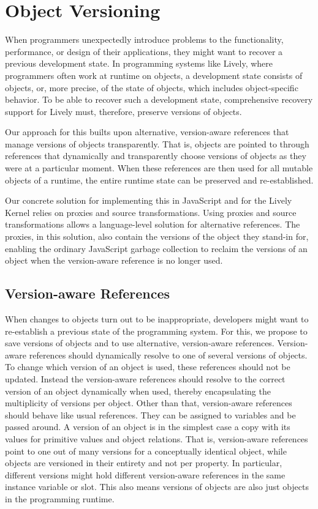 \chapter{Object Versioning} \label{chapter:APPROACH}

When programmers unexpectedly introduce problems to the functionality, performance, or design of their applications, they might want to recover a previous development state.
In programming systems like Lively, where programmers often work at runtime on objects, a development state consists of objects, or, more precise, of the state of objects, which includes object-specific behavior.
To be able to recover such a development state, comprehensive recovery support for Lively must, therefore, preserve versions of objects.

Our approach for this builts upon alternative, version-aware references that manage versions of objects transparently.
That is, objects are pointed to through references that dynamically and transparently choose versions of objects as they were at a particular moment.
When these references are then used for all mutable objects of a runtime, the entire runtime state can be preserved and re-established.

Our concrete solution for implementing this in JavaScript and for the Lively Kernel relies on proxies and source transformations.
Using proxies and source transformations allows a language-level solution for alternative references.
The proxies, in this solution, also contain the versions of the object they stand-in for, enabling the ordinary JavaScript garbage collection to reclaim the versions of an object when the version-aware reference is no longer used.



\section{Version-aware References} \label{sec:APPROACH:1}



When changes to objects turn out to be inappropriate, developers might want to re-establish a previous state of the programming system.
For this, we propose to save versions of objects and to use alternative, version-aware references.
Version-aware references should dynamically resolve to one of several versions of objects.
To change which version of an object is used, these references should not be updated.
Instead the version-aware references should resolve to the correct version of an object dynamically when used, thereby encapsulating the multiplicity of versions per object.
Other than that, version-aware references should behave like usual references.
They can be assigned to variables and be passed around.
A version of an object is in the simplest case a copy with its values for primitive values and object relations.
That is, version-aware references point to one out of many versions for a conceptually identical object, while objects are versioned in their entirety and not per property.
In particular, different versions might hold different version-aware references in the same instance variable or slot.
This also means versions of objects are also just objects in the programming runtime.

